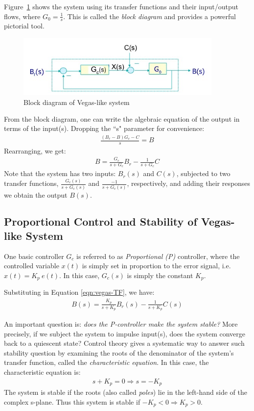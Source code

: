 \documentclass{article}
\begin{document}
Figure~\ref{fig:vegas-BD} shows the system using its transfer functions and their input/output flows,
where $G_0 = \frac{1}{s}$.
This is called the {\em block diagram} and provides a powerful pictorial tool.
\begin{figure}[htbp]
   \centering
   \includegraphics[width=4in]{figures/vegas-BD.jpg} %
   \caption{Block diagram of Vegas-like system}
   \label{fig:vegas-BD}
\end{figure} 
From the block diagram, one can write the algebraic equation of the output in terms of the input(s).
Dropping the ``s" parameter for convenience:
\begin{eqnarray*}
\frac{(B_r - B) G_c - C}{s} = B
\end{eqnarray*}
Rearranging, we get:
\begin{eqnarray}
B = \frac{G_c}{s + G_c} B_r - \frac{1}{s + G_c} C
\label{eqn:vegas-TF}
\end{eqnarray}
Note that the system has two inputs: $B_r(s)$ and $C(s)$, subjected to two transfer functions,
$\frac{G_c(s)}{s + G_c(s)}$ and $\frac{-1}{s + G_c(s)}$, respectively, and 
adding their responses we obtain the output $B(s)$.

\subsection{Proportional Control and Stability of Vegas-like System}

One basic controller $G_c$ is referred to as {\em Proportional (P)} controller, where
the controlled variable $x(t)$ is simply set in proportion to the error signal,
i.e. $x(t) = K_p\ e(t)$.
In this case, $G_c(s)$ is simply the constant $K_p$. 

Substituting in Equation \ref{eqn:vegas-TF}, we have:
\begin{eqnarray}
B(s) = \frac{K_p}{s + K_p} B_r(s) - \frac{1}{s + K_p} C(s)
\label{eqn:P-ess}
\end{eqnarray}

An important question is: {\em does the P-controller make the system stable?}
More precisely, if we subject the system to impulse input(s),
does the system converge back to a quiescent state?
Control theory gives a systematic way to answer such stability question by
examining the roots of the denominator of the system's transfer function,
called the {\em characteristic equation}. 
In this case,
the characteristic equation is:
\begin{eqnarray*}
s + K_p = 0 \Rightarrow s = - K_p
\end{eqnarray*}
The system is stable if the roots (also called {\em poles}) lie in the left-hand side of the complex s-plane.
Thus this system is stable if $- K_p < 0 \Rightarrow K_p > 0$.
\end{document}
